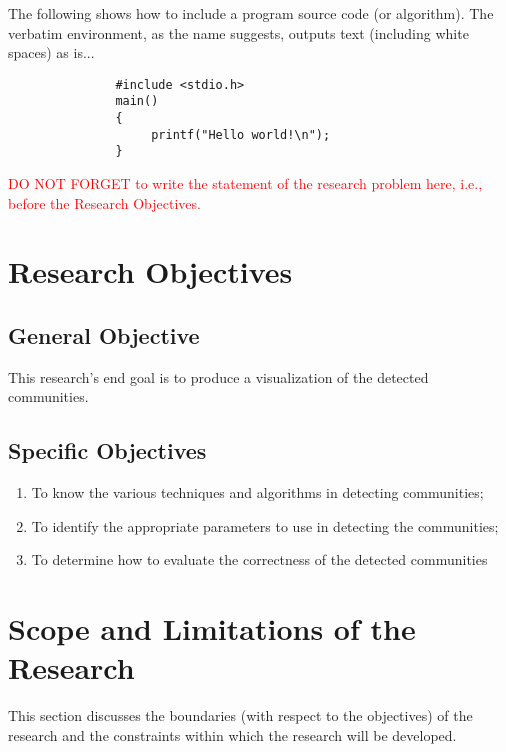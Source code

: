 The following shows how to include a program source code (or algorithm).  The verbatim environment,\cite{West:2014,Xie:2012,Zhang:2012}
as the name suggests, outputs text (including white spaces) as is...

\begin{verbatim}
               #include <stdio.h>
               main()
               {
                    printf("Hello world!\n");
               }
\end{verbatim}


\textcolor{red}{DO NOT FORGET to write the statement of the research problem here, i.e.,
before the Research Objectives.}



\section{Research Objectives}
\label{sec:researchobjectives}

\subsection{General Objective}
\label{sec:generalobjective}

This research's end goal is to produce a visualization of the detected communities.


\subsection{Specific Objectives}
\label{sec:specificobjectives}

\begin{enumerate}
	\item To know the various techniques and algorithms in detecting communities;
	\item To identify the appropriate parameters to use in detecting the communities;
	\item To determine how to evaluate the correctness of the detected communities
\end{enumerate}

\section{Scope and Limitations of the Research}
\label{sec:scopelimitations}

This section discusses the boundaries (with respect to the objectives) of the research and the constraints within 
which the research will be developed.


